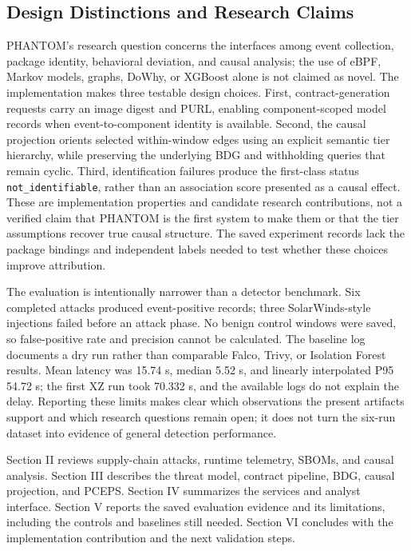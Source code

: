 \documentclass[conference]{IEEEtran}
\begin{document}
\subsection{Design Distinctions and Research Claims}
PHANTOM's research question concerns the interfaces among event collection, package identity, behavioral deviation, and causal analysis; the use of eBPF, Markov models, graphs, DoWhy, or XGBoost alone is not claimed as novel. The implementation makes three testable design choices. First, contract-generation requests carry an image digest and PURL, enabling component-scoped model records when event-to-component identity is available. Second, the causal projection orients selected within-window edges using an explicit semantic tier hierarchy, while preserving the underlying BDG and withholding queries that remain cyclic. Third, identification failures produce the first-class status \texttt{not\_identifiable}, rather than an association score presented as a causal effect. These are implementation properties and candidate research contributions, not a verified claim that PHANTOM is the first system to make them or that the tier assumptions recover true causal structure. The saved experiment records lack the package bindings and independent labels needed to test whether these choices improve attribution.

The evaluation is intentionally narrower than a detector benchmark. Six completed attacks produced event-positive records; three SolarWinds-style injections failed before an attack phase. No benign control windows were saved, so false-positive rate and precision cannot be calculated. The baseline log documents a dry run rather than comparable Falco, Trivy, or Isolation Forest results. Mean latency was 15.74 s, median 5.52 s, and linearly interpolated P95 54.72 s; the first XZ run took 70.332 s, and the available logs do not explain the delay. Reporting these limits makes clear which observations the present artifacts support and which research questions remain open; it does not turn the six-run dataset into evidence of general detection performance.

Section II reviews supply-chain attacks, runtime telemetry, SBOMs, and causal analysis. Section III describes the threat model, contract pipeline, BDG, causal projection, and PCEPS. Section IV summarizes the services and analyst interface. Section V reports the saved evaluation evidence and its limitations, including the controls and baselines still needed. Section VI concludes with the implementation contribution and the next validation steps.
\end{document}

